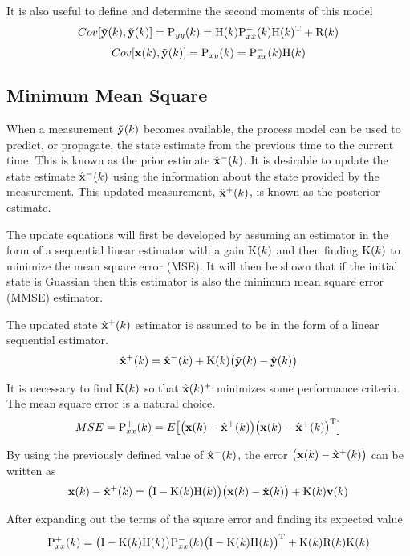 It is also useful to define and determine the second moments of this model
\begin{equation}
Cov[\tilde{\mathrm{\mathbf{y}}}(k),\tilde{\mathrm{\mathbf{y}}}(k)]=\mathrm{P}_{yy}(k)=\mathrm{H}(k)\mathrm{P}_{xx}^-(k)\mathrm{H}(k)^{\mathrm{T}}+\mathrm{R}(k)
\end{equation}
\begin{equation}
Cov[\mathrm{\mathbf{x}}(k),\tilde{\mathrm{\mathbf{y}}}(k)]=\mathrm{P}_{xy}(k)=\mathrm{P}_{xx}^-(k)\mathrm{H}(k)
\end{equation}

\subsection{Minimum Mean Square}
When a measurement $ \tilde{\mathrm{\mathbf{y}}}(k) $ becomes available, the process model can be used to predict, or propagate, the state estimate from the previous time to the current time.
This is known as the prior estimate $ \hat{\mathrm{\mathbf{x}}}^-(k) $.
It is desirable to update the state estimate $ \hat{\mathrm{\mathbf{x}}}^-(k) $ using the information about the state provided by the measurement. 
This updated measurement, $ \hat{\mathrm{\mathbf{x}}}^+(k) $, is known as the posterior estimate.

The update equations will first be developed by assuming an estimator in the form of a sequential linear estimator with a gain $ \mathrm{K}(k) $ and then finding $ \mathrm{K}(k) $ to minimize the mean square error (MSE).
It will then be shown that if the initial state is Guassian then this estimator is also the minimum mean square error (MMSE) estimator.

The updated state $ \hat{\mathrm{\mathbf{x}}}^+(k) $ estimator is assumed to be in the form of a linear sequential estimator. 
\begin{equation}
\hat{\mathrm{\mathbf{x}}}^+(k) = \hat{\mathrm{\mathbf{x}}}^-(k) + \mathrm{K}(k)\big(\tilde{\mathrm{\mathbf{y}}}(k)-\hat{\mathrm{\mathbf{y}}}(k)\big)
\end{equation}

It is necessary to find $ \mathrm{K}(k) $ so that $ \hat{\mathrm{\mathbf{x}}}(k)^+ $ minimizes some performance criteria. 
The mean square error is a natural choice. 
\begin{equation}
 MSE=\mathrm{P}_{xx}^+(k)=E\big[\big(\mathrm{\mathbf{x}}(k)-\hat{\mathrm{\mathbf{x}}}^+(k)\big)\big(\mathrm{\mathbf{x}}(k)-\hat{\mathrm{\mathbf{x}}}^+(k)\big)^{\mathrm{T}}\big]
\end{equation}

By using the previously defined value of  $ \hat{\mathrm{\mathbf{x}}}^-(k) $, the error $ \big(\mathrm{\mathbf{x}}(k)-\hat{\mathrm{\mathbf{x}}}^+(k)\big) $ can be written as
\begin{equation}
\mathrm{\mathbf{x}}(k)-\hat{\mathrm{\mathbf{x}}}^+(k) = \big(\mathrm{I} -\mathrm{K}(k)\mathrm{H}(k)\big) \big(\mathrm{\mathbf{x}}(k)-\hat{\mathrm{\mathbf{x}}}(k)\big) + \mathrm{K}(k)\mathrm{\mathbf{v}}(k)
\end{equation}

After expanding out the terms of the square error and finding its expected value
\begin{equation}
\mathrm{P}_{xx}^+(k)=\big(\mathrm{I} -\mathrm{K}(k)\mathrm{H}(k)\big) \mathrm{P}_{xx}^-(k) \big(\mathrm{I} -\mathrm{K}(k)\mathrm{H}(k)\big) ^{\mathrm{T}}+\mathrm{K}(k)\mathrm{R}(k)\mathrm{K}(k)
\end{equation}

